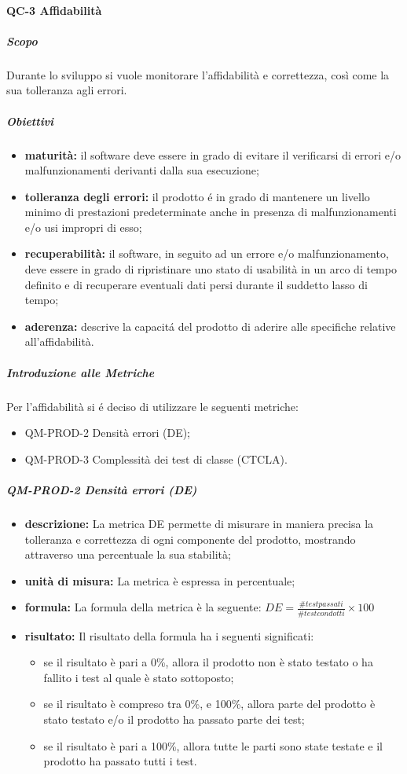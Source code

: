 		\paragraph{QC-3 Affidabilità}
			\subparagraph{Scopo}
				Durante lo sviluppo si vuole monitorare l'affidabilità e correttezza, così come la sua tolleranza agli errori.
			\subparagraph{Obiettivi}
				\begin{itemize}
					\item \textbf{maturità:} il software deve essere in grado di evitare il verificarsi di errori e/o malfunzionamenti derivanti dalla sua esecuzione;
					\item \textbf{tolleranza degli errori:} il prodotto é in grado di mantenere un livello minimo di prestazioni predeterminate anche in presenza di malfunzionamenti e/o usi impropri di esso;
					\item \textbf{recuperabilità:} il software, in seguito ad un errore e/o malfunzionamento, deve essere in grado di ripristinare uno stato di usabilità in un arco di tempo definito e di recuperare eventuali dati persi durante il suddetto lasso di tempo;
					\item \textbf{aderenza:} descrive la capacitá del prodotto di aderire alle specifiche relative all'affidabilità.
				\end{itemize}
			\subparagraph{Introduzione alle Metriche}
				Per l'affidabilità si é deciso di utilizzare le seguenti metriche:
				\begin{itemize}
					\item QM-PROD-2 Densità errori (DE);
					\item QM-PROD-3 Complessità dei test di classe (CTCLA).
				\end{itemize}
			\subparagraph{ QM-PROD-2 Densità errori (DE)}
			\begin{itemize}
      			\item \textbf{descrizione: }
					La metrica DE permette di misurare in maniera precisa la tolleranza e correttezza di ogni componente del prodotto, mostrando attraverso una percentuale la sua stabilità;
				\item \textbf{unità di misura: }
					La metrica è espressa in percentuale;
				\item \textbf{formula: }
					La formula della metrica è la seguente:
					\(DE = \frac{\# test passati}{\# test condotti}\times100\)
				\item \textbf{risultato: }
					Il risultato della formula ha i seguenti significati:
					\begin{itemize}
						\item se il risultato è pari a 0\%, allora il prodotto non è stato testato o ha fallito i test al quale è stato sottoposto;
						\item se il risultato è compreso tra 0\%, e 100\%, allora parte del prodotto è stato testato e/o il prodotto ha passato parte dei test;
						\item se il risultato è pari a 100\%, allora tutte le parti sono state testate e il prodotto ha passato tutti i test.
					\end{itemize}
			\end{itemize}
